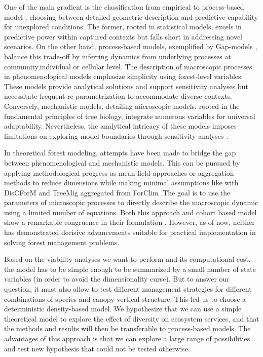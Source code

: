 \documentclass{article}
\begin{document}
One of the main gradient is the classification from empirical to process-based model \autocite{fontesModelsSupportingForest2011},  choosing between detailed geometric description and predictive capability for unexplored conditions. The former, rooted in statistical models, excels in predictive power within captured contexts but falls short in addressing novel scenarios. On the other hand, process-based models, exemplified by Gap-models \autocite{bugmannREVIEWFORESTGAP2001}, balance this trade-off by inferring dynamics from underlying processes at community,individual or cellular level. The description of macroscopic processes in phenomenological models emphasize simplicity using forest-level variables. These models provide analytical solutions and support sensitivity analyses but necessitate frequent re-parametrization to accommodate diverse contexts. Conversely, mechanistic models, detailing microscopic models, rooted in the fundamental principles of tree biology, integrate numerous variables for universal adaptability. Nevertheless, the analytical intricacy of these models imposes limitations on exploring model boundaries through sensitivity analyses \autocite{bugmannREVIEWFORESTGAP2001}.

In theoretical forest modeling, attempts have been made to bridge the gap between phenomenological and mechanistic models. This can be pursued by applying methodological progress as mean-field approaches or aggregation methods to reduce dimensions while making minimal assumptions like  with DisCForM and TreeMig \autocite{lischkeAggregationIndividualTrees1998,lischkeTreeMigForestlandscapeModel2006} aggregated from ForClim \autocite{bugmannEcologyMountainousForests1994}.The goal is to use the parameters of microscopic processes to directly describe the macroscopic dynamic using a limited number of equations.
Both this approach and cohort based model show a remarkable congruence in their formulation \autocite{bugmannREVIEWFORESTGAP2001}. However, as of now, neither has demonstrated decisive advancements suitable for practical implementation in solving forest management problems.

Based on the viability analyses we want to perform and its computational cost, the model has to be simple enough to be summarized by a small number of state variables (in order to avoid the dimensionality curse). But to answer our question, it must also allow to test different management strategies for different combinations of species and canopy vertical structure. This led us to choose a deterministic density-based model. We hypothesize that we can use a simple theoretical model to explore the effect of diversity on ecosystem services, and that the methods and results will then be transferable to process-based models. The advantages of this approach is that we can explore a large range of possibilities and test new hypothesis that could not be tested otherwise.
\end{document}
